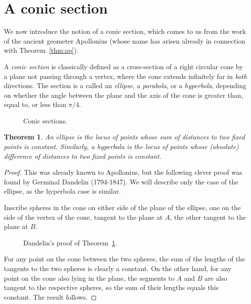 \documentclass[12pt]{book}
\numberwithin{exc}{section}
\numberwithin{figure}{section}
\newtheorem{theorem}{Theorem}[section]
\numberwithin{equation}{theorem}
\begin{document}
\section{A conic section}
\label{sec:con}

We now introduce the notion of a conic section, which comes to us
from the work of the ancient geometer Apollonius 
(whose name has arisen already in connection with
Theorem~\ref{thm:ap}).

A \emph{conic section} 
is classically defined as a cross-section of a 
right circular cone by a plane not passing through a vertex, 
where the cone extends 
infinitely far in \emph{both} directions. The section is a called an 
\emph{ellipse}, 
a \emph{parabola}, 
or a \emph{hyperbola}, 
depending on 
whether the angle between the plane and the axis of the cone is 
greater than, equal to, or less than $\pi/4$. 
\begin{figure}[ht]
\caption{Conic sections.}
\end{figure}

\begin{theorem} \label{thm:conic-dist}
An ellipse is the locus of points whose sum of distances to two fixed 
points is constant. Similarly, a hyperbola is the locus of points 
whose (absolute) difference of distances to two fixed points is 
constant.
\end{theorem}
\begin{proof}
This was already known to Apollonius, 
but the following clever proof was
found by Germinal Dandelin (1794-1847). 
We will describe only the case of the 
ellipse, as the hyperbola case is similar.

Inscribe spheres in the cone on either side of the plane of the 
ellipse, one on the side of the vertex of the cone, tangent to the plane 
at $A$, the other tangent to the plane at $B$. 
\begin{figure}[ht]
\caption{Dandelin's proof of Theorem~\ref{thm:conic-dist}.}
\end{figure}
For any point 
on the cone between the two spheres, the sum of the lengths of the 
tangents to the two spheres is clearly a constant. On the other hand, 
for any point on the cone also lying in the plane, the segments to $A$ 
and $B$ are also tangent to the respective spheres, so the sum of 
their lengths equals this constant. The result follows.
\end{proof}
\end{document}
